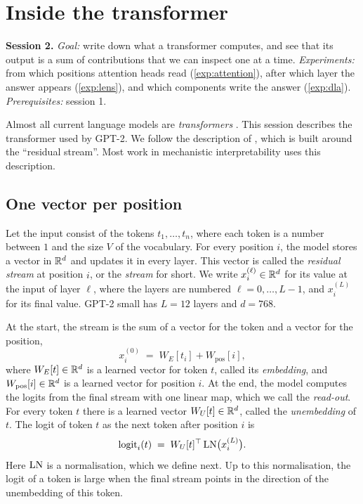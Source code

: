 \section{Inside the transformer}
\label{sec:transformer}

\begin{sessioncard}
\textbf{Session 2.} \emph{Goal:} write down what a transformer computes, and see that its output is a sum of
contributions that we can inspect one at a time.
\emph{Experiments:} from which positions attention heads read (\cref{exp:attention}), after which layer the answer
appears (\cref{exp:lens}), and which components write the answer (\cref{exp:dla}).
\emph{Prerequisites:} session 1.
\end{sessioncard}

Almost all current language models are \emph{transformers} \citep{vaswani2017attention}. This session describes
the transformer used by GPT-2. We follow the description of \citet{elhage2021mathematical}, which is built around
the ``residual stream''. Most work in mechanistic interpretability uses this description.

\subsection{One vector per position}

Let the input consist of the tokens $t_1,\dots,t_n$, where each token is a number between $1$ and the size $V$
of the vocabulary. For every position $i$, the model stores a vector in $\mathbb{R}^d$ and updates it in every layer. This
vector is called the \emph{residual stream} at position $i$, or the \emph{stream} for short. We write
$x_i^{(\ell)}\in\mathbb{R}^d$ for its value at the input of layer $\ell$, where the layers are numbered $\ell=0,\dots,L-1$,
and $x_i^{(L)}$ for its final value. GPT-2 small has $L=12$ layers and $d=768$.

At the start, the stream is the sum of a vector for the token and a vector for the position,
\begin{equation}\label{eq:embed}
x_i^{(0)} \;=\; W_E[t_i] + W_{\mathrm{pos}}[i],
\end{equation}
where $W_E[t]\in\mathbb{R}^d$ is a learned vector for token $t$, called its \emph{embedding}, and
$W_{\mathrm{pos}}[i]\in\mathbb{R}^d$ is a learned vector for position $i$. At the end, the model computes the logits from
the final stream with one linear map, which we call the \emph{read-out}. For every token $t$ there is a learned
vector $W_U[t]\in\mathbb{R}^d$, called the \emph{unembedding} of $t$. The logit of token $t$ as the next token after
position $i$ is
\begin{equation}\label{eq:unembed}
\mathrm{logit}_i(t) \;=\; W_U[t]^\top\,\mathrm{LN}\big(x_i^{(L)}\big).
\end{equation}
Here $\mathrm{LN}$ is a normalisation, which we define next. Up to this normalisation, the logit of a token is large when
the final stream points in the direction of the unembedding of this token.

